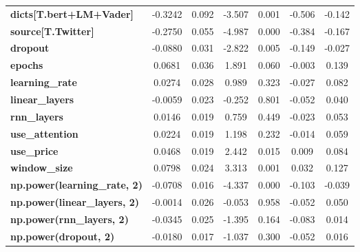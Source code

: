 \begin{center}
\begin{tabular}{lcccccc}
\textbf{dicts[T.bert+LM+Vader]}      &      -0.3242  &        0.092     &    -3.507  &         0.001        &       -0.506    &       -0.142     \\
\textbf{source[T.Twitter]}           &      -0.2750  &        0.055     &    -4.987  &         0.000        &       -0.384    &       -0.167     \\
\textbf{dropout}                     &      -0.0880  &        0.031     &    -2.822  &         0.005        &       -0.149    &       -0.027     \\
\textbf{epochs}                      &       0.0681  &        0.036     &     1.891  &         0.060        &       -0.003    &        0.139     \\
\textbf{learning\_rate}              &       0.0274  &        0.028     &     0.989  &         0.323        &       -0.027    &        0.082     \\
\textbf{linear\_layers}              &      -0.0059  &        0.023     &    -0.252  &         0.801        &       -0.052    &        0.040     \\
\textbf{rnn\_layers}                 &       0.0146  &        0.019     &     0.759  &         0.449        &       -0.023    &        0.053     \\
\textbf{use\_attention}              &       0.0224  &        0.019     &     1.198  &         0.232        &       -0.014    &        0.059     \\
\textbf{use\_price}                  &       0.0468  &        0.019     &     2.442  &         0.015        &        0.009    &        0.084     \\
\textbf{window\_size}                &       0.0798  &        0.024     &     3.313  &         0.001        &        0.032    &        0.127     \\
\textbf{np.power(learning\_rate, 2)} &      -0.0708  &        0.016     &    -4.337  &         0.000        &       -0.103    &       -0.039     \\
\textbf{np.power(linear\_layers, 2)} &      -0.0014  &        0.026     &    -0.053  &         0.958        &       -0.052    &        0.050     \\
\textbf{np.power(rnn\_layers, 2)}    &      -0.0345  &        0.025     &    -1.395  &         0.164        &       -0.083    &        0.014     \\
\textbf{np.power(dropout, 2)}        &      -0.0180  &        0.017     &    -1.037  &         0.300        &       -0.052    &        0.016     \\

\end{tabular}
\end{center}
